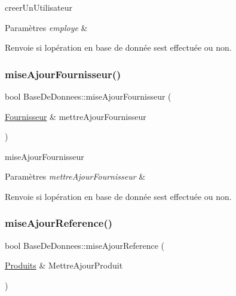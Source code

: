creer\+Un\+Utilisateur 


\begin{DoxyParams}{Paramètres}
{\em employe} & \\
\hline
\end{DoxyParams}
\begin{DoxyReturn}{Renvoie}
si l\textquotesingle{}opération en base de donnée s\textquotesingle{}est effectuée ou non. 
\end{DoxyReturn}
\mbox{\label{class_base_de_donnees_ab49e6dfff0eecf616d9a7642ea358f31}} 
\subsubsection{\texorpdfstring{mise\+Ajour\+Fournisseur()}{miseAjourFournisseur()}}
{\footnotesize\ttfamily bool Base\+De\+Donnees\+::mise\+Ajour\+Fournisseur (\begin{DoxyParamCaption}\item[{\mbox{\hyperlink{class_fournisseur}{Fournisseur}} \&}]{mettre\+Ajour\+Fournisseur }\end{DoxyParamCaption})}



mise\+Ajour\+Fournisseur 


\begin{DoxyParams}{Paramètres}
{\em mettre\+Ajour\+Fournisseur} & \\
\hline
\end{DoxyParams}
\begin{DoxyReturn}{Renvoie}
si l\textquotesingle{}opération en base de donnée s\textquotesingle{}est effectuée ou non. 
\end{DoxyReturn}
\mbox{\label{class_base_de_donnees_ae68726c99e17a89342655d8b842ced96}} 
\subsubsection{\texorpdfstring{mise\+Ajour\+Reference()}{miseAjourReference()}}
{\footnotesize\ttfamily bool Base\+De\+Donnees\+::mise\+Ajour\+Reference (\begin{DoxyParamCaption}\item[{\mbox{\hyperlink{class_produits}{Produits}} \&}]{Mettre\+Ajour\+Produit }\end{DoxyParamCaption})}



